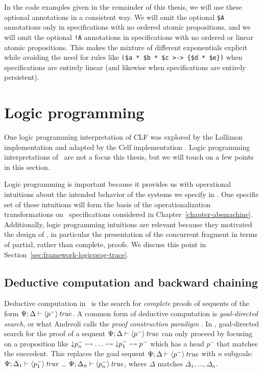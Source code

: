 In the code examples given in the remainder of this thesis, we will
use these optional annotations in a consistent way.  We will omit the
optional \verb|$A| annotations only in specifications with no ordered
atomic propositions, and we will omit the optional \verb|!A|
annotations in specifications with no ordered or linear atomic
propositions. This makes the mixture of different exponentials
explicit while avoiding the need for rules like
\verb|($a * $b * $c >-> {$d * $e})| when specifications are entirely
linear (and likewise when specifications are entirely persistent).

\section{Logic programming}
\label{sec:framework-logicprog}

One logic programming interpretation of CLF was explored by the
Lollimon implementation \cite{lopez05monadic} and adapted by the Celf
implementation
\cite{schacknielsen08celf,schacknielsen11implementing}. Logic
programming interpretations of \sls~are not a focus this thesis, but
we will touch on a few points in this section.

Logic programming is important because it provides us with operational
intuitions about the intended behavior of the systems we specify in
\sls. One specific set of these intuitions will form the basis of the
operationalization transformations on \sls~specifications considered
in Chapter~\ref{chapter-absmachine}. 
Additionally, logic programming intuitions are relevant
because they motivated the design of \sls, in particular the
presentation of the concurrent fragment in terms of partial, rather
than complete, proofs. We discuss this point in
Section~\ref{sec:framework-logicprog-trace}.

\subsection{Deductive computation and backward chaining}
\label{sec:framework-logicprog-deductive}
\label{sec:framework-modes}

Deductive computation in \sls~is the search for {\it complete} proofs
of sequents of the form ${\Psi};{\Delta} \vdash {{\langle {p^-} \rangle}\,{{\it true}}} \mathstrut$.  A
common form of deductive computation is {\it goal-directed search}, or
what Andreoli calls the {\it proof construction paradigm}
\cite{andreoli01focussing}.
In \sls, goal-directed search for the proof of a sequent
${\Psi};{\Delta} \vdash {{\langle {p^-} \rangle}\,{{\it true}}} \mathstrut$ can only proceed by focusing
on a proposition like ${\downarrow}p_n^- \rightarrowtail \ldots \rightarrowtail
{\downarrow}p_1^- \rightarrowtail p^-$ which has a head $p^-$ that matches the
succedent. This replaces the goal sequent
${\Psi};{\Delta} \vdash {{\langle {p^-} \rangle}\,{{\it true}}} \mathstrut$ with $n$ subgoals:
${\Psi};{\Delta_1} \vdash {{\langle {p_1^-} \rangle}\,{{\it true}}} \mathstrut$ \ldots
${\Psi};{\Delta_n} \vdash {{\langle {p_n^-} \rangle}\,{{\it true}}} \mathstrut$, where $\Delta$ matches
$\Delta_1,\ldots,\Delta_n$.

